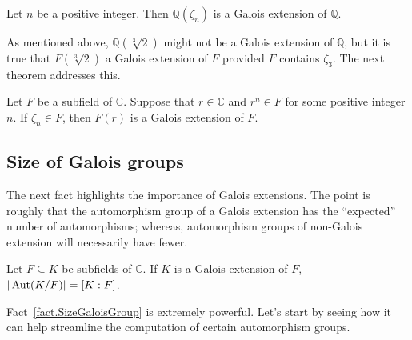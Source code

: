 \begin{theorem}\label{thm.QAdjoinZetanIsGalois}
Let $n$ be a positive integer. Then $\mathbb{Q}(\zeta_{n})$ is a Galois extension of $\mathbb{Q}$.
\end{theorem}

As mentioned above, $\mathbb{Q}(\sqrt[3]{2})$ might not be a Galois extension of $\mathbb{Q}$, but it is true that  $F(\sqrt[3]{2})$ a Galois extension of $F$ provided $F$ contains $\zeta_3$. The next theorem addresses this.

\begin{theorem}\label{thm.QAdjoinRadicalIsGaloisOverFieldWithRootsUnity}
Let $F$ be a subfield of $\mathbb{C}$. Suppose that $r\in \mathbb{C}$ and $r^n\in F$ for some positive integer $n$. If $\zeta_n\in F$, then $F(r)$ is a Galois extension of $F$.
\end{theorem}

\subsection{Size of Galois groups}
The next fact highlights the importance of Galois extensions. The point is roughly that the automorphism group of a Galois extension has the ``expected'' number of automorphisms; whereas, automorphism groups of non-Galois extension will necessarily have fewer.

\begin{fact}\label{fact.SizeGaloisGroup}
Let $F\subseteq K$ be subfields of $\mathbb{C}$. If $K$ is a Galois extension of $F$,  $|\operatorname{Aut}(K/F)| = [K:F]$.
\end{fact}

Fact~\ref{fact.SizeGaloisGroup} is extremely powerful. Let's start by seeing how it can help streamline the computation of certain automorphism groups.

